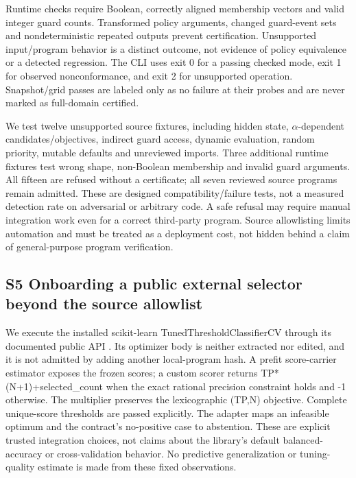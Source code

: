 \documentclass[11pt,a4paper]{article}
\theoremstyle{plain}
\theoremstyle{definition}
\theoremstyle{remark}
\begin{document}
Runtime checks require Boolean, correctly aligned membership vectors and valid integer guard counts. Transformed policy arguments, changed guard-event sets and nondeterministic repeated outputs prevent certification. Unsupported input/program behavior is a distinct outcome, not evidence of policy equivalence or a detected regression. The CLI uses exit 0 for a passing checked mode, exit 1 for observed nonconformance, and exit 2 for unsupported operation. Snapshot/grid passes are labeled only as no failure at their probes and are never marked as full-domain certified.

We test twelve unsupported source fixtures, including hidden state, $\alpha$-dependent candidates/objectives, indirect guard access, dynamic evaluation, random priority, mutable defaults and unreviewed imports. Three additional runtime fixtures test wrong shape, non-Boolean membership and invalid guard arguments. All fifteen are refused without a certificate; all seven reviewed source programs remain admitted. These are designed compatibility/failure tests, not a measured detection rate on adversarial or arbitrary code. A safe refusal may require manual integration work even for a correct third-party program. Source allowlisting limits automation and must be treated as a deployment cost, not hidden behind a claim of general-purpose program verification.


\subsection*{S5 Onboarding a public external selector beyond the source allowlist}\label{sec:s5}

We execute the installed scikit-learn TunedThresholdClassifierCV through its documented public API \cite{sklearn_tuned}. Its optimizer body is neither extracted nor edited, and it is not admitted by adding another local-program hash. A prefit score-carrier estimator exposes the frozen scores; a custom scorer returns TP*(N+1)+selected\_count when the exact rational precision constraint holds and -1 otherwise. The multiplier preserves the lexicographic (TP,N) objective. Complete unique-score thresholds are passed explicitly. The adapter maps an infeasible optimum and the contract's no-positive case to abstention. These are explicit trusted integration choices, not claims about the library's default balanced-accuracy or cross-validation behavior. No predictive generalization or tuning-quality estimate is made from these fixed observations.
\end{document}
